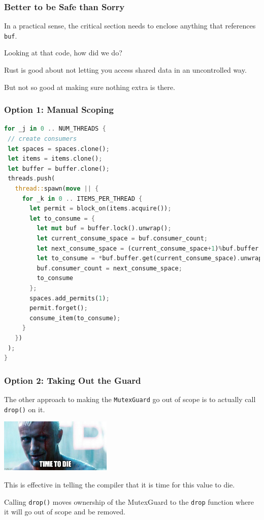 \begin{frame}
\frametitle{Better to be Safe than Sorry}

In a practical sense, the critical section needs to enclose anything that references \texttt{buf}.

Looking at that code, how did we do?

Rust is good about not letting you access shared data in an uncontrolled way.

But not so good at making sure nothing extra is there.

\end{frame}


\begin{frame}[fragile]
\frametitle{Option 1: Manual Scoping}

\begin{lstlisting}[language=Rust]
for _j in 0 .. NUM_THREADS {
 // create consumers
 let spaces = spaces.clone();
 let items = items.clone();
 let buffer = buffer.clone();
 threads.push(
   thread::spawn(move || {
     for _k in 0 .. ITEMS_PER_THREAD {
       let permit = block_on(items.acquire());
       let to_consume = {
         let mut buf = buffer.lock().unwrap();
         let current_consume_space = buf.consumer_count;
         let next_consume_space = (current_consume_space+1)%buf.buffer.len();
         let to_consume = *buf.buffer.get(current_consume_space).unwrap();
         buf.consumer_count = next_consume_space;
         to_consume
       };
       spaces.add_permits(1);
       permit.forget();
       consume_item(to_consume);
     }
   })
 );
}
\end{lstlisting}

\end{frame}

\begin{frame}
\frametitle{Option 2: Taking Out the Guard}

The other approach to making the \texttt{MutexGuard} go out of scope is to actually call \texttt{drop()} on it. 

\begin{center}
	\includegraphics[width=0.4\textwidth]{images/batty2.jpg}
\end{center}

This is effective in telling the compiler that it is time for this value to die. 

Calling \texttt{drop()} moves ownership of the MutexGuard to the \texttt{drop} function where it will go out of scope and be removed. 

\end{frame}


